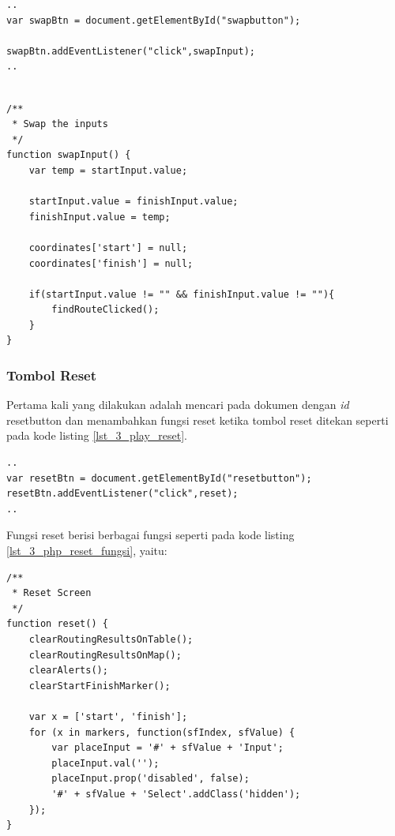 \begin{lstlisting}[caption=\textit{Method} untuk memanggil fungsi JavaScript ketika tombol \textit{swap} ditekan ,label = {lst_3_play_swap}]
..
var swapBtn = document.getElementById("swapbutton");

swapBtn.addEventListener("click",swapInput);
..
\end{lstlisting}

\begin{lstlisting}[caption=Fungsi JavaScript untuk menukar isi \textit{textfield} tempat asal dan tujuan ,label = {lst_3_pplay_swap_fungsi}]	

/**
 * Swap the inputs
 */
function swapInput() {
    var temp = startInput.value;

    startInput.value = finishInput.value;
    finishInput.value = temp;

    coordinates['start'] = null;
    coordinates['finish'] = null;
    
    if(startInput.value != "" && finishInput.value != ""){
        findRouteClicked();
    }
}
\end{lstlisting}

\subsubsection{Tombol Reset}
Pertama kali yang dilakukan adalah mencari pada dokumen dengan \textit{id} resetbutton dan menambahkan fungsi reset ketika tombol reset ditekan seperti pada kode listing \ref{lst_3_play_reset}. 

\begin{lstlisting}[caption=\textit{Method} untuk memanggil fungsi JavaScript ketika tombol \textit{reset} ditekan ,label = {lst_3_play_reset}]
..
var resetBtn = document.getElementById("resetbutton");
resetBtn.addEventListener("click",reset);
..
\end{lstlisting}

Fungsi reset berisi berbagai fungsi seperti pada kode listing \ref{lst_3_php_reset_fungsi}, yaitu:

\begin{lstlisting}[caption=Fungsi JavaScript reset ,label = {lst_3_play_reset_fungsi}]	
/**
 * Reset Screen
 */
function reset() {
    clearRoutingResultsOnTable();
    clearRoutingResultsOnMap();
    clearAlerts();
    clearStartFinishMarker();

    var x = ['start', 'finish'];
    for (x in markers, function(sfIndex, sfValue) {
        var placeInput = '#' + sfValue + 'Input';
        placeInput.val('');
        placeInput.prop('disabled', false);
        '#' + sfValue + 'Select'.addClass('hidden');
    });
}
\end{lstlisting}


